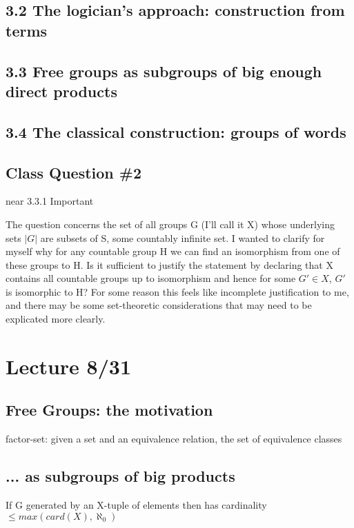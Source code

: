 \documentclass[12pt]{article}
\begin{document}
\subsection{3.2 The logician's approach: construction from terms}

\subsection{3.3 Free groups as subgroups of big enough direct products}

\subsection{3.4 The classical construction: groups of words}


\subsection{Class Question \#2}

near 3.3.1
Important

The question concerns the set of all groups G (I'll call it X) whose underlying sets $|G|$ are subsets of S, some countably infinite set.  I wanted to clarify for myself why for any countable group H we can find an isomorphism from one of these groups to H.  Is it sufficient to justify the statement by declaring that X contains all countable groups up to isomorphism and hence for some $G' \in X$, $G'$ is isomorphic to H?  For some reason this feels like incomplete justification to me, and there may be some set-theoretic considerations that may need to be explicated more clearly.

\section{Lecture 8/31}

\subsection{Free Groups: the motivation}

\noindent
factor-set: given a set and an equivalence relation, the set of equivalence classes

\subsection{... as subgroups of big products}

\noindent
If G generated by an X-tuple of elements then has cardinality $\leq max(card(X), \aleph_0)$
\end{document}
